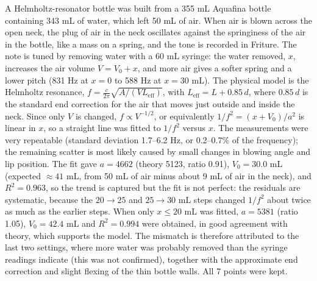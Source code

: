 \documentclass[11pt]{article}
\begin{document}
\vspace{0.4em}
\noindent
A Helmholtz-resonator bottle was built from a 355 mL Aquafina bottle containing 343 mL of water, which left 50 mL of air. When air is blown across the open neck, the plug of air in the neck
oscillates against the springiness of the air in the bottle, like a mass on a spring, and the tone is recorded in Friture. The note is tuned by removing water with a 60 mL syringe: the water removed, $x$,
increases the air volume $V = V_0 + x$, and more air gives a softer spring and a lower pitch (831 Hz at $x = 0$ to 588 Hz at $x = 30$ mL). The physical model is the Helmholtz resonance,
$f = \frac{c}{2\pi}\sqrt{A/(V L_\mathrm{eff})}$, with $L_\mathrm{eff} = L + 0.85\,d$, where $0.85\,d$ is the standard end correction for the air that moves just outside and inside the neck.
Since only $V$ is changed, $f \propto V^{-1/2}$, or equivalently $1/f^2 = (x + V_0)/a^2$ is linear in $x$, so a straight line was fitted to $1/f^2$ versus $x$.
The measurements were very repeatable (standard deviation 1.7--6.2 Hz, or 0.2--0.7\% of the frequency); the remaining scatter is most likely caused by small changes in blowing angle and lip position.
The fit gave $a = 4662$ (theory 5123, ratio 0.91), $V_0 = 30.0$ mL (expected $\approx 41$ mL, from 50 mL of air minus about 9 mL of air in the neck), and $R^2 = 0.963$, so the trend is captured but the fit is not perfect:
the residuals are systematic, because the $20\to25$ and $25\to30$ mL steps changed $1/f^2$ about twice as much as the earlier steps. When only $x \le 20$ mL was fitted, $a = 5381$ (ratio 1.05),
$V_0 = 42.4$ mL and $R^2 = 0.994$ were obtained, in good agreement with theory, which supports the model. The mismatch is therefore attributed to the last two settings, where more water was probably removed than
the syringe readings indicate (this was not confirmed), together with the approximate end correction and slight flexing of the thin bottle walls. All 7 points were kept.

\vspace{0.6em}
\end{document}
